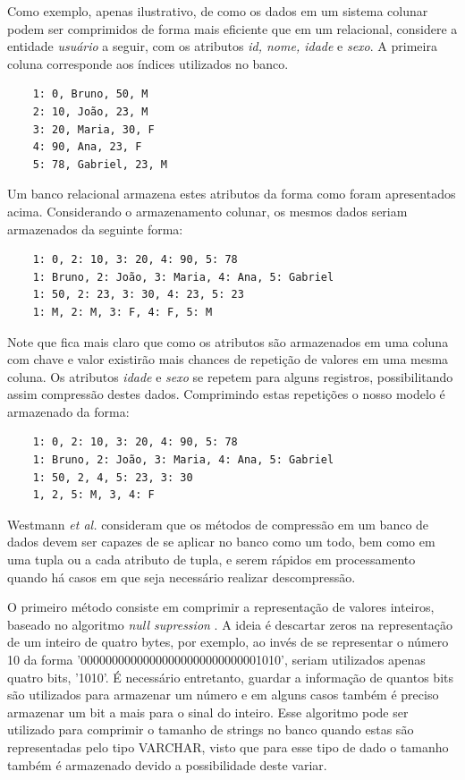 Como exemplo, apenas ilustrativo, de como os dados em um sistema colunar podem ser comprimidos de forma mais 
eficiente que em um relacional, considere a entidade \textit{usuário} a seguir, com os 
atributos \textit{id, nome, idade} e \textit{sexo}. A primeira coluna corresponde aos índices utilizados no banco. 

\begin{verbatim}
    1: 0, Bruno, 50, M
    2: 10, João, 23, M
    3: 20, Maria, 30, F
    4: 90, Ana, 23, F
    5: 78, Gabriel, 23, M
\end{verbatim}

Um banco relacional armazena estes atributos da forma como foram apresentados acima. 
Considerando o armazenamento colunar, os mesmos dados seriam armazenados da seguinte forma: 

\begin{verbatim}
    1: 0, 2: 10, 3: 20, 4: 90, 5: 78
    1: Bruno, 2: João, 3: Maria, 4: Ana, 5: Gabriel
    1: 50, 2: 23, 3: 30, 4: 23, 5: 23
    1: M, 2: M, 3: F, 4: F, 5: M
\end{verbatim}

Note que fica mais claro que como os atributos são armazenados em uma coluna com chave e valor 
existirão mais chances de repetição de valores em uma mesma coluna. Os atributos \textit{idade} e 
\textit{sexo} se repetem para alguns registros, possibilitando assim compressão destes dados. 
Comprimindo estas repetições o nosso modelo é armazenado da forma: 

\begin{verbatim}
    1: 0, 2: 10, 3: 20, 4: 90, 5: 78
    1: Bruno, 2: João, 3: Maria, 4: Ana, 5: Gabriel
    1: 50, 2, 4, 5: 23, 3: 30
    1, 2, 5: M, 3, 4: F
\end{verbatim}

Westmann \textit{et al.} \cite{westmann2000implementation} consideram que os métodos de compressão em um banco de dados devem ser capazes de se aplicar 
no banco como um todo, bem como em uma tupla ou a cada atributo de tupla, e serem rápidos em processamento quando há casos em que seja 
necessário realizar descompressão.

O primeiro método consiste em comprimir a representação de valores inteiros, baseado no algoritmo \textit{null supression} \cite{westmann2000implementation, roth1993database}. A ideia é descartar zeros na representação de um inteiro de quatro bytes, por exemplo, 
ao invés de se representar o número 10 da forma '00000000000000000000000000001010', seriam utilizados apenas quatro bits, '1010'. É 
necessário entretanto, guardar a informação de quantos bits são utilizados para armazenar um número e em alguns casos também é preciso 
armazenar um bit a mais para o sinal do inteiro. Esse algoritmo pode ser utilizado para comprimir o tamanho de strings no banco 
quando estas são representadas pelo tipo VARCHAR, visto que para esse tipo de dado o tamanho também é armazenado devido a possibilidade 
deste variar.

